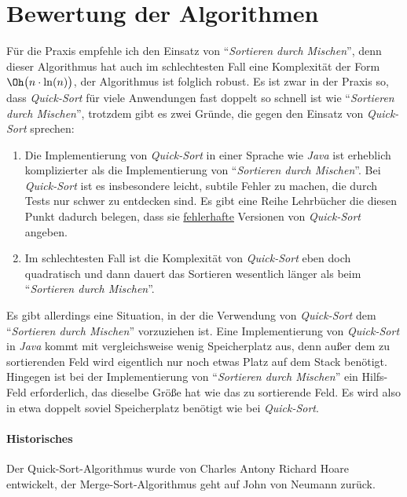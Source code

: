 \section{Bewertung der Algorithmen}
F\"ur die Praxis empfehle ich den Einsatz von ``\emph{Sortieren durch Mischen}'', denn dieser Algorithmus hat auch im schlechtesten Fall 
eine Komplexit\"at der Form $\Oh\bigl(n\cdot \ln(n)\bigr)$, der Algorithmus ist folglich robust.
Es ist zwar in der Praxis so, dass \emph{Quick-Sort} f\"ur viele Anwendungen fast doppelt   
so schnell ist wie ``\emph{Sortieren durch Mischen}'', trotzdem gibt es zwei Gr\"unde, die gegen den Einsatz von
\emph{Quick-Sort} sprechen:
\begin{enumerate}
\item Die Implementierung von \emph{Quick-Sort} in einer Sprache wie \textsl{Java} ist erheblich komplizierter als 
      die Implementierung von ``\emph{Sortieren durch Mischen}''.
      Bei \emph{Quick-Sort} ist es insbesondere leicht, subtile Fehler zu machen, die durch Tests nur schwer 
      zu entdecken sind.  Es gibt eine Reihe Lehrb\"ucher die diesen Punkt dadurch belegen, dass sie
      \underline{fehlerhafte} Versionen von \emph{Quick-Sort} angeben.
\item Im schlechtesten Fall ist die Komplexit\"at von \emph{Quick-Sort} eben doch quadratisch und dann dauert das
      Sortieren wesentlich l\"anger als beim ``\emph{Sortieren durch Mischen}''.
\end{enumerate}
Es gibt allerdings eine Situation, in der die Verwendung von \emph{Quick-Sort} dem ``\emph{Sortieren durch Mischen}'' 
vorzuziehen ist.  Eine Implementierung von \emph{Quick-Sort} in \textsl{Java} kommt mit vergleichsweise wenig Speicherplatz aus,
denn au{\ss}er dem zu sortierenden Feld wird eigentlich nur noch etwas Platz auf dem Stack ben\"otigt.  Hingegen
ist bei der Implementierung von ``\emph{Sortieren durch Mischen}'' ein Hilfs-Feld erforderlich, das dieselbe Gr\"o{\ss}e hat
wie das zu sortierende Feld.  Es wird also in etwa doppelt soviel Speicherplatz ben\"otigt wie bei 
\emph{Quick-Sort}.

\paragraph{Historisches}  
Der Quick-Sort-Algorithmus wurde von Charles Antony Richard Hoare \cite{hoare:61}
entwickelt, der Merge-Sort-Algorithmus geht auf John von Neumann zur\"uck.

